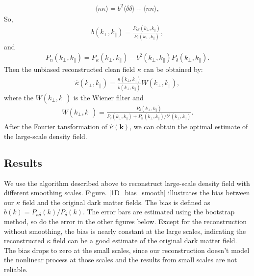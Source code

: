 \documentclass[aps,prd,twocolumn,showpacs,superscriptaddress,groupedaddress,nofootinbib]{revtex4}  %
\begin{document}
\begin{eqnarray}
\langle\kappa\kappa\rangle = b^2\langle\delta\delta\rangle+\langle nn\rangle,
\label{eq19}
\end{eqnarray}
So,
\begin{eqnarray}
b(k_\perp, k_\parallel) = \frac{P_{\kappa\delta}(k_\perp, k_\parallel)}{P_{\delta}(k_\perp, k_\parallel)},
\label{eq20}
\end{eqnarray}
and 
\begin{eqnarray}
P_{n}(k_\perp, k_\parallel) = P_{\kappa}(k_\perp, k_\parallel) - b^2(k_\perp, k_\parallel)P_{\delta}(k_\perp, k_\parallel).
\label{eq21}
\end{eqnarray}
Then the unbiased reconstructed clean field $\kappa$ can be obtained by:
\begin{eqnarray}
\hat{\kappa}(k_\perp, k_\parallel) = \frac{\kappa(k_\perp, k_\parallel)}{b(k_\perp, k_\parallel)}W(k_\perp, k_\parallel),
\label{eq22}
\end{eqnarray}
where the $W(k_\perp, k_\parallel)$ is the Wiener filter and 
\begin{eqnarray}
W(k_\perp, k_\parallel) = \frac{P_{\delta}(k_\perp, k_\parallel)}{P_{\delta}(k_\perp, k_\parallel) + P_{n}(k_\perp, k_\parallel)/b^2(k_\perp, k_\parallel)}.
\label{eq23}
\end{eqnarray}
After the Fourier tansformation of $\hat{\kappa}(\bm{k})$, we can obtain the optimal estimate of the large-scale density field. 


\subsection{Results}

We use the algorithm described above to reconstruct large-scale density field with different smoothing scales. Figure. \ref{1D_bias_smooth} illustrates the bias between our $\kappa$ field and the original dark matter fields. The bias is defined as $b(k) = P_{\kappa\delta}(k)/P_{\delta}(k)$. The error bars are estimated using the bootstrap method, so do the error in the other figures below.  Except for the reconstruction without smoothing, the bias is nearly constant at the large scales, indicating the reconstructed $\kappa$ field can be a good estimate of the original dark matter field. The bias drops to zero at the small scales, since our reconstruction doesn't model the nonlinear process at those scales and the results from small scales are not reliable.
\end{document}
